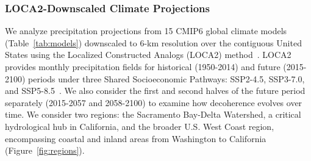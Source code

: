 \subsubsection{LOCA2-Downscaled Climate Projections}
We analyze precipitation projections from 15 CMIP6 global climate models~\cite{eyring2016overview} (Table~\ref{tab:models}) downscaled to 6-km resolution over the contiguous United States using the Localized Constructed Analogs (LOCA2) method~\cite{pierce2014statistical,pierce2015improved,pierce2023future}.
%
LOCA2 provides monthly precipitation fields for historical (1950-2014) and future (2015-2100) periods under three Shared Socioeconomic Pathways: SSP2-4.5, SSP3-7.0, and SSP5-8.5~\cite{riahi2017shared}.
%
We also consider the first and second halves of the future period separately (2015-2057 and 2058-2100) to examine how decoherence evolves over time.
%
We consider two regions: the Sacramento Bay-Delta Watershed, a critical hydrological hub in California, and the broader U.S. West Coast region, encompassing coastal and inland areas from Washington to California (Figure~\ref{fig:regions}).

